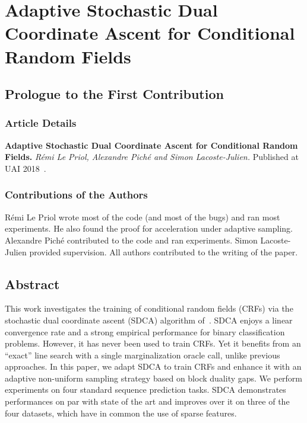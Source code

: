 \setcounter{theorem}{0}

\def\balpha{\boldsymbol{\alpha}}
\def\bmu{\boldsymbol{\mu}}
\def\bw{\boldsymbol{w}}
\newcommand{\bu}{\bm u}
\newcommand{\bv}{\bm v}
\newcommand{\strgconvex}{\mu}
\newcommand{\QM}{QM} %


\chapter{Adaptive Stochastic Dual Coordinate Ascent for Conditional Random Fields}
\label{ch:sdca}

\section*{Prologue to the First Contribution}


\subsection*{Article Details}

\textbf{Adaptive Stochastic Dual Coordinate Ascent for Conditional Random Fields.}
\emph{R\'emi Le Priol, Alexandre Pich\'e and Simon Lacoste-Julien.}
Published at UAI 2018~\citep{lepriol2018adaptive}.

\subsection*{Contributions of the Authors}
Rémi Le Priol wrote most of the code (and most of the bugs) and ran most experiments.
He also found the proof for acceleration under adaptive sampling.
Alexandre Piché contributed to the code and ran experiments.
Simon Lacoste-Julien provided supervision.
All authors contributed to the writing of the paper.

 \section*{Abstract}
This work investigates the training of conditional random fields (CRFs) via the stochastic dual coordinate ascent (SDCA) algorithm of~\citet{shalev2016accelerated}.
SDCA enjoys a linear convergence rate and a strong empirical performance for binary classification problems.
However, it has never been used to train CRFs.
Yet it benefits from an ``exact'' line search with a single marginalization oracle call, unlike previous approaches.
In this paper, we adapt SDCA to train CRFs and enhance it with an adaptive non-uniform sampling strategy based on block duality gaps.
We perform experiments on four standard sequence prediction tasks.
SDCA demonstrates performances on par with state of the art and improves over it on three of the four datasets, which have in common the use of sparse features.

